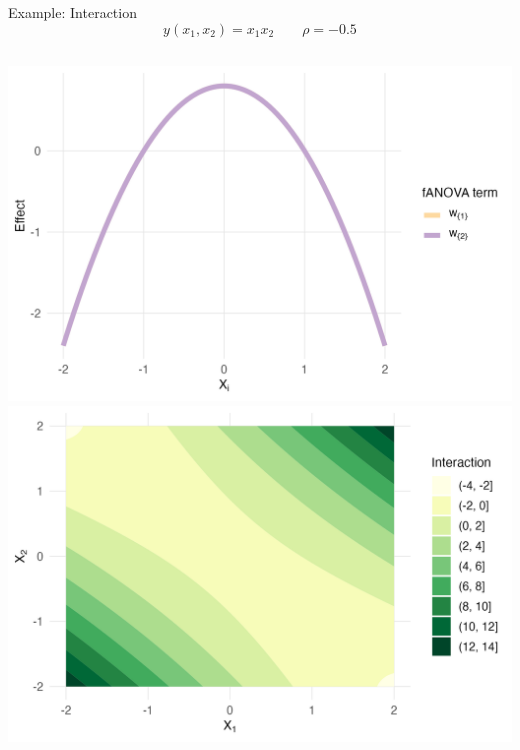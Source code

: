 \begin{frame}{Example: Interaction}
  \[
  y(x_1, x_2) = x_1 x_2 \qquad \rho = -0.5
  \]
    \begin{columns}
      \includegraphics[width=\linewidth]{../images/experiment_section/interaction_a1p00_a2p00_a11p00_a22p00_a12p20_rhom05_main.png}
      \includegraphics[width=\linewidth]{../images/experiment_section/interaction_a1p00_a2p00_a11p00_a22p00_a12p20_rhom05_interaction.png}
  \end{columns}
  
\end{frame}

